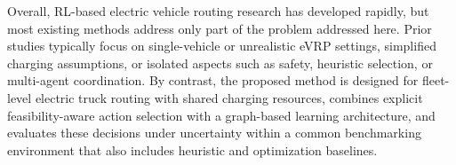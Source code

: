 \documentclass[journal]{IEEEtran}
\begin{document}
Overall, RL-based electric vehicle routing research has developed rapidly, but most existing methods address only part of the problem addressed here. Prior studies typically focus on single-vehicle or unrealistic eVRP settings, simplified charging assumptions, or isolated aspects such as safety, heuristic selection, or multi-agent coordination. By contrast, the proposed method is designed for fleet-level electric truck routing with shared charging resources, combines explicit feasibility-aware action selection with a graph-based learning architecture, and evaluates these decisions under uncertainty within a common benchmarking environment that also includes heuristic and optimization baselines.






\end{document}

